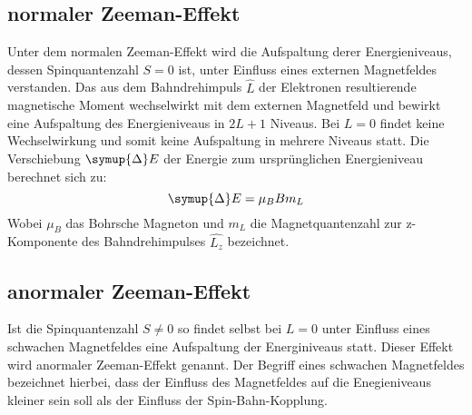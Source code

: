 \subsection{normaler Zeeman-Effekt}
\label{sec:nzeeman}

Unter dem normalen Zeeman-Effekt wird die Aufspaltung derer Energieniveaus, dessen Spinquantenzahl $S = 0$ ist, unter Einfluss eines externen Magnetfeldes verstanden.
Das aus dem Bahndrehimpuls $\hat{L}$ der Elektronen resultierende magnetische Moment wechselwirkt mit dem externen Magnetfeld und bewirkt eine Aufspaltung des Energieniveaus in $2L+1$ Niveaus.  Bei $L = 0$ findet keine Wechselwirkung und somit keine Aufspaltung in mehrere Niveaus statt.
Die Verschiebung $\symup{\Delta} E$ der Energie zum ursprünglichen Energieniveau berechnet sich zu:
\begin{equation}
\symup{\Delta} E = \mu_B B m_L
\label{eq:nzeeman}
\end{equation}
Wobei $\mu_B$ das Bohrsche Magneton und $m_L$ die Magnetquantenzahl zur z-Komponente des Bahndrehimpulses $\hat{L_z}$ bezeichnet.\\








\subsection{anormaler Zeeman-Effekt}
\label{sec:anzeeman}

Ist die Spinquantenzahl $S \neq 0$ so findet selbst bei $L = 0$ unter Einfluss eines schwachen Magnetfeldes eine Aufspaltung der Energiniveaus statt.
Dieser Effekt wird anormaler Zeeman-Effekt genannt.
Der Begriff eines schwachen Magnetfeldes bezeichnet hierbei, dass der Einfluss des Magnetfeldes auf die Enegieniveaus kleiner sein soll als der Einfluss der Spin-Bahn-Kopplung.


